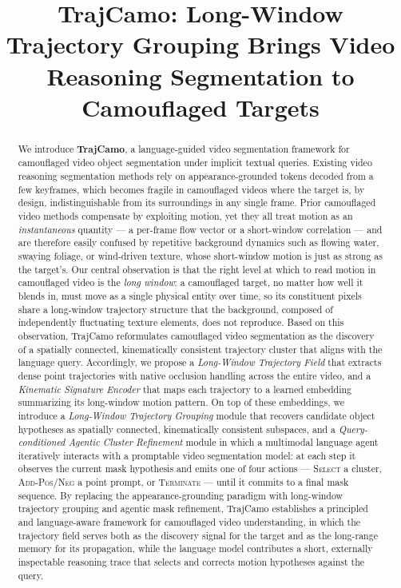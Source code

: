 \documentclass[11pt]{article}
\title{TrajCamo: Long-Window Trajectory Grouping Brings Video Reasoning Segmentation to Camouflaged Targets}
\author{}
\date{}
\begin{document}
\maketitle



\begin{abstract}
	We introduce \textbf{TrajCamo}, a language-guided video segmentation framework for camouflaged video object segmentation under implicit textual queries.
	Existing video reasoning segmentation methods rely on appearance-grounded tokens decoded from a few keyframes, which becomes fragile in camouflaged videos where the target is, by design, indistinguishable from its surroundings in any single frame.
	Prior camouflaged video methods compensate by exploiting motion, yet they all treat motion as an \emph{instantaneous} quantity --- a per-frame flow vector or a short-window correlation --- and are therefore easily confused by repetitive background dynamics such as flowing water, swaying foliage, or wind-driven texture, whose short-window motion is just as strong as the target's.
	Our central observation is that the right level at which to read motion in camouflaged video is the \emph{long window}: a camouflaged target, no matter how well it blends in, must move as a single physical entity over time, so its constituent pixels share a long-window trajectory structure that the background, composed of independently fluctuating texture elements, does not reproduce.
	Based on this observation, TrajCamo reformulates camouflaged video segmentation as the discovery of a spatially connected, kinematically consistent trajectory cluster that aligns with the language query.
	Accordingly, we propose a \emph{Long-Window Trajectory Field} that extracts dense point trajectories with native occlusion handling across the entire video, and a \emph{Kinematic Signature Encoder} that maps each trajectory to a learned embedding summarizing its long-window motion pattern.
	On top of these embeddings, we introduce a \emph{Long-Window Trajectory Grouping} module that recovers candidate object hypotheses as spatially connected, kinematically consistent subspaces, and a \emph{Query-conditioned Agentic Cluster Refinement} module in which a multimodal language agent iteratively interacts with a promptable video segmentation model: at each step it observes the current mask hypothesis and emits one of four actions --- \textsc{Select} a cluster, \textsc{Add-Pos}/\textsc{Neg} a point prompt, or \textsc{Terminate} --- until it commits to a final mask sequence.
	By replacing the appearance-grounding paradigm with long-window trajectory grouping and agentic mask refinement, TrajCamo establishes a principled and language-aware framework for camouflaged video understanding, in which the trajectory field serves both as the discovery signal for the target and as the long-range memory for its propagation, while the language model contributes a short, externally inspectable reasoning trace that selects and corrects motion hypotheses against the query.
\end{abstract}
\end{document}
